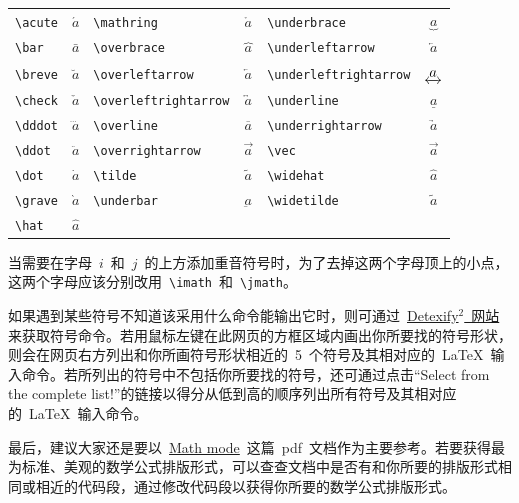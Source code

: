 {\wuhao\vspace{0.5em}\noindent\begin{tabularx}{\textwidth}{Xc|Xc|Xc}
  \verb|\acute| & $\acute{a}$ & \verb|\mathring|           & $\mathring{a}$           & \verb|\underbrace|          & $\underbrace{a}$          \\
  \verb|\bar|   & $\bar{a}$   & \verb|\overbrace|          & $\overbrace{a}$          & \verb|\underleftarrow|      & $\underleftarrow{a}$      \\
  \verb|\breve| & $\breve{a}$ & \verb|\overleftarrow|      & $\overleftarrow{a}$      & \verb|\underleftrightarrow| & $\underleftrightarrow{a}$ \\
  \verb|\check| & $\check{a}$ & \verb|\overleftrightarrow| & $\overleftrightarrow{a}$ & \verb|\underline|           & $\underline{a}$           \\
  \verb|\dddot| & $\dddot{a}$ & \verb|\overline|           & $\overline{a}$           & \verb|\underrightarrow|     & $\underrightarrow{a}$     \\
  \verb|\ddot|  & $\ddot{a}$  & \verb|\overrightarrow|     & $\overrightarrow{a}$     & \verb|\vec|                 & $\vec{a}$                 \\
  \verb|\dot|   & $\dot{a}$   & \verb|\tilde|              & $\tilde{a}$              & \verb|\widehat|             & $\widehat{a}$             \\
  \verb|\grave| & $\grave{a}$ & \verb|\underbar|           & $\underbar{a}$           & \verb|\widetilde|           & $\widetilde{a}$           \\
  \verb|\hat|   & $\hat{a}$
\end{tabularx}\vspace{0.5em}}

当需要在字母~$i$~和~$j$~的上方添加重音符号时，为了去掉这两个字母顶上的小点，这两个字母应该分别改用~\verb|\imath|~和~\verb|\jmath|。

如果遇到某些符号不知道该采用什么命令能输出它时，则可通过~\href{http://detexify.kirelabs.org/classify.html}{Detexify$^2$~网站}来获取符号命令。若用鼠标左键在此网页的方框区域内画出你所要找的符号形状，则会在网页右方列出和你所画符号形状相近的~5~个符号及其相对应的~\LaTeX~输入命令。若所列出的符号中不包括你所要找的符号，还可通过点击“Select from the complete list!”的链接以得分从低到高的顺序列出所有符号及其相对应的~\LaTeX~输入命令。

最后，建议大家还是要以~\href{http://tug.ctan.org/cgi-bin/ctanPackageInformation.py?id=voss-mathmode}{Math mode}~这篇~pdf~文档作为主要参考。若要获得最为标准、美观的数学公式排版形式，可以查查文档中是否有和你所要的排版形式相同或相近的代码段，通过修改代码段以获得你所要的数学公式排版形式。

